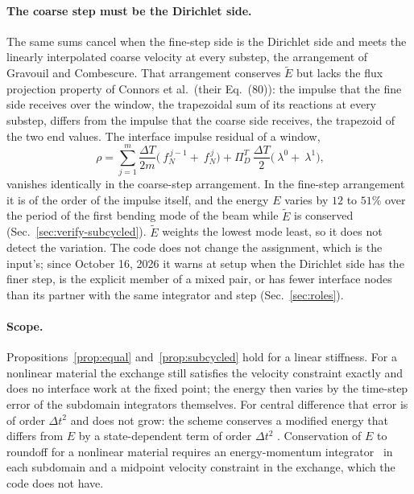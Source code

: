 \documentclass[11pt]{article}
\begin{document}
\paragraph{The coarse step must be the Dirichlet side.} The same sums
cancel when the fine-step side is the Dirichlet side and meets the
linearly interpolated coarse velocity at every substep, the arrangement of
Gravouil and Combescure. That arrangement conserves $\tilde{E}$ but lacks
the flux projection property of Connors et al.\ (their Eq.~(80)): the
impulse that the fine side receives over the window, the trapezoidal sum of
its reactions at every substep, differs from the impulse that the coarse
side receives, the trapezoid of the two end values. The interface impulse
residual of a window,
\begin{equation}
  ~\rho = \sum_{j=1}^{m} \frac{\Delta T}{2m}\bigl(~f_N^{\,j-1} + ~f_N^{\,j}\bigr)
        + \Pi_D^T\, \frac{\Delta T}{2}\bigl(~\lambda^0 + ~\lambda^1\bigr),
  \label{eq:impulse}
\end{equation}
vanishes identically in the coarse-step arrangement. In the fine-step
arrangement it is of the order of the impulse itself, and the energy $E$
varies by $12$ to $51\%$ over the period of the first bending mode of the
beam while $\tilde{E}$ is conserved (Sec.~\ref{sec:verify-subcycled}).
$\tilde{E}$ weights the lowest mode least, so it does not detect the
variation. The code does not change the assignment, which is the input's;
since October 16, 2026 it warns at setup when the Dirichlet side has the
finer step, is the explicit member of a mixed pair, or has fewer interface
nodes than its partner with the same integrator and step
(Sec.~\ref{sec:roles}).

\paragraph{Scope.} Propositions~\ref{prop:equal} and~\ref{prop:subcycled}
hold for a linear stiffness. For a nonlinear material the exchange still
satisfies the velocity constraint exactly and does no interface work at the
fixed point;
the energy then varies by the time-step error of the subdomain integrators
themselves. For central difference that error is of order $\Delta t^2$ and
does not grow: the scheme conserves a modified energy that differs from $E$
by a state-dependent term of order $\Delta t^2$
\cite{HairerLubichWanner2006}. Conservation of $E$ to roundoff for a
nonlinear material requires an energy-momentum
integrator~\cite{SimoTarnow1992,Gonzalez1996} in each subdomain and a
midpoint velocity constraint in the exchange, which the code does not
have.
\end{document}
